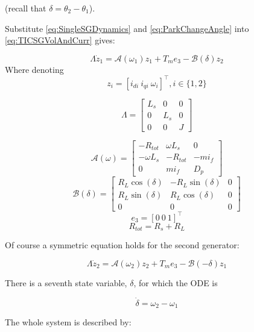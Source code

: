 \documentclass[conference]{IEEEtran}
\begin{document}
(recall that $\delta=\theta_{2}-\theta_{1}$).

Substitute \eqref{eq:SingleSGDynamics} and \eqref{eq:ParkChangeAngle} into \eqref{eq:TICSGVolAndCurr}  gives:

\[
\varLambda\dot{z}_{1}=\mathcal{A}(\omega_{1})z_{1}+T_{m}e_{3}-\mathcal{B}(\delta)z_{2}
\]
Where denoting
 \[z_{i}=\left[i_{di}\ i_{qi}\  \omega_{i}\right]^\top,i\in\{1,2\}\]

\[
\varLambda=\left[\begin{array}{ccc}
L_{s} & 0 & 0\\
0 & L_{s} & 0\\
0 & 0 & J
\end{array}\right]
\]

\[
\mathcal{A}(\omega)=\left[\begin{array}{ccc}
-R_{tot} & \omega L_{s} & 0\\
-\omega L_{s} & -R_{tot} & -mi_{f}\\
0 & mi_{f} & D_{p}
\end{array}\right]
\]
\[\mathcal{B}(\delta)=\left[\begin{array}{ccc}
R_{L}\cos(\delta) & -R_{L}\sin(\delta) & 0\\
R_{L}\sin(\delta) & R_{L}\cos(\delta) & 0\\
0 & 0 & 0
\end{array}\right]
\]
\[e_{3}=\left[0\ 0\ 1\right]^\top\]
\[ R_{tot}=R_{s}+R_{L} \]

Of course a symmetric equation holds for the second generator:

\[
\varLambda\dot{z}_{2}=\mathcal{A}(\omega_{2})z_{2}+T_{m}e_{3}-\mathcal{B}(-\delta)z_{1}
\]

There is a seventh state variable, $\delta$, for which the ODE is 

\[
\dot{\delta}=\omega_{2}-\omega_{1}
\]

The whole system is described by:
\end{document}
